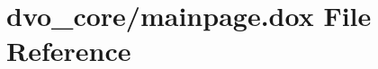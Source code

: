 \hypertarget{dvo__core_2mainpage_8dox}{}\section{dvo\+\_\+core/mainpage.dox File Reference}
\label{dvo__core_2mainpage_8dox}
